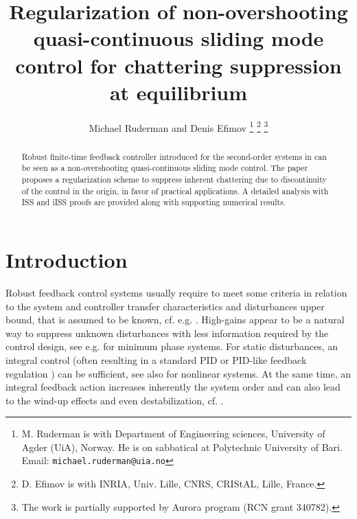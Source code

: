 \documentclass[letterpaper, 10 pt, conference]{ieeeconf}  %
\title{\LARGE \bf Regularization of non-overshooting quasi-continuous sliding mode control for chattering suppression at equilibrium}
\author{Michael Ruderman and Denis Efimov  %
\thanks{M. Ruderman is with Department of Engineering sciences, University of Agder (UiA), Norway. He is on sabbatical at Polytechnic University of Bari. \newline
Email: {\tt\small michael.ruderman@uia.no}}%
\thanks{D. Efimov is with INRIA, Univ. Lille, CNRS, CRIStAL, Lille, France.}%
\thanks{The work is partially supported by Aurora program
(RCN grant 340782).}
}
\begin{document}
\newtheorem{theorem}{Theorem}
\newtheorem{prop}{Proposition}
\newtheorem{rem}{Remark}
\newtheorem{defin}{Definition}



\maketitle \thispagestyle{empty} \pagestyle{empty}


\begin{abstract}

Robust finite-time feedback controller introduced for the second-order systems in \cite{ruderman2024robust} can be seen as a non-overshooting quasi-continuous sliding mode control. The paper proposes a regularization scheme to suppress inherent chattering due to discontinuity of the control \cite{ruderman2024robust} in the origin, in favor of practical applications. A detailed analysis with ISS and iISS proofs are provided along with supporting numerical results.   
\end{abstract}


\section{Introduction}
\label{sec:1}

Robust feedback control systems usually require to meet some criteria in relation to the system and controller transfer characteristics and disturbances upper bound, that is assumed to be known, cf. e.g. \cite{kwakernaak1993robust}. High-gains appear to be a natural way to suppress unknown disturbances with less information required by the control design, see e.g. \cite{tsypkin1999} for minimum phase systems. For static disturbances, an integral control (often resulting in a standard PID or PID-like feedback regulation \cite{aastrom2006}) can be sufficient, see also \cite{khalil2000universal} for nonlinear systems. At the same time, an integral feedback action increases inherently the system order and can also lead to the wind-up effects and even destabilization, cf. \cite{hippe2006}. 
\end{document}
